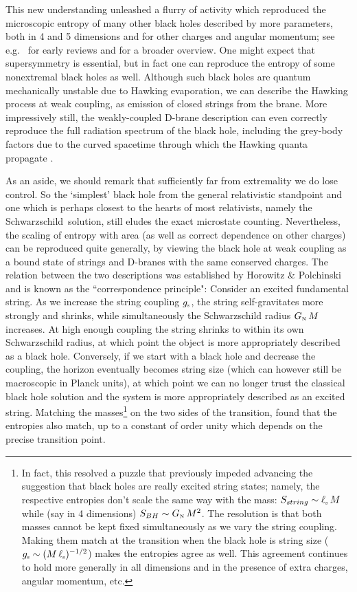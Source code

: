 \documentclass[12pt,a4paper]{article}
\def\schw{Schwarzschild}
\def\gst{g_{\scriptscriptstyle {\rm s}}}
\def\GN{G_{\scriptscriptstyle {\rm N}}}
\def\lst{\ell_{\scriptscriptstyle {\rm s}}}
\begin{document}
This new understanding unleashed a flurry of activity which
reproduced the microscopic entropy of many other black holes described by more parameters, both in 4 and 5 dimensions and for other charges and angular momentum; see e.g.\ \cite{Horowitz:1996qd,Horowitz:1996rn} for early reviews and \cite{Dabholkar:2012zz} for a broader overview. 
One might expect that supersymmetry is essential, but in fact one can reproduce the entropy of some nonextremal black holes as well.  Although such black holes are quantum mechanically unstable due to Hawking evaporation, we can describe the Hawking process at weak coupling, as emission of closed strings from the brane.  More impressively still, the weakly-coupled D-brane description can even correctly reproduce the full radiation  spectrum of the black hole, including the grey-body factors due to the curved spacetime through which the Hawking quanta propagate  \cite{Maldacena:1996ix}.


As an aside, we should remark that sufficiently far from extremality we do lose control.  So the `simplest' black hole from the general relativistic standpoint and one which is perhaps closest to the hearts of most relativists, namely the \schw\ solution, still eludes the exact microstate counting.  Nevertheless, the scaling of entropy with area (as well as correct dependence on other charges) can be reproduced quite generally, by viewing the black hole at weak coupling as a bound state of strings and D-branes with the same conserved charges.  The relation between the two descriptions was established by Horowitz \& Polchinski    \cite{Horowitz:1996nw} and is known as the ``correspondence principle":
Consider an excited fundamental string.  As we increase the string coupling $\gst$, the string self-gravitates more strongly and shrinks, while simultaneously the Schwarzschild radius $\GN \, M$ increases.  At high enough coupling the string shrinks to within its own Schwarzschild radius, at which point the object is more appropriately described as a black hole.  Conversely, if we start with a black hole and decrease the coupling,  the horizon eventually becomes string size (which can however still be macroscopic in Planck units),  at which point we can no longer trust the classical black hole solution and the system is more appropriately described as an excited string.  Matching the masses\footnote{
In fact, this resolved a puzzle that previously impeded advancing the suggestion \cite{Susskind:1993ws} that black holes are really excited string states; namely, the respective entropies don't scale the same way with the mass:  $S_{string} \sim \lst \, M$ while (say in 4 dimensions) $S_{BH} \sim \GN \, M^2$.  The resolution is that both masses cannot be kept fixed simultaneously as we vary the string coupling.  Making them match at the transition when the black hole is string size ($\gst \sim (M \, \lst)^{-1/2}$) makes the entropies agree as well.  This agreement continues to hold more generally in all dimensions and in the presence of extra charges, angular momentum, etc.
} on the two sides of the transition, \cite{Horowitz:1996nw} found that the entropies also match, up to a constant of order unity which depends on the precise transition point. 
\end{document}
